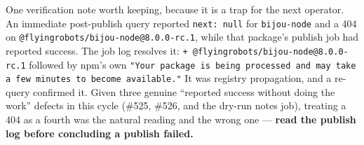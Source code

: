 One verification note worth keeping, because it is a trap for the next operator. An immediate post-publish query reported \texttt{n\allowbreak{}e\allowbreak{}x\allowbreak{}t\allowbreak{}:\allowbreak{} \allowbreak{}n\allowbreak{}u\allowbreak{}l\allowbreak{}l} for \texttt{b\allowbreak{}i\allowbreak{}j\allowbreak{}o\allowbreak{}u\allowbreak{}-\allowbreak{}n\allowbreak{}o\allowbreak{}d\allowbreak{}e} and a 404 on \texttt{@\allowbreak{}f\allowbreak{}l\allowbreak{}y\allowbreak{}i\allowbreak{}n\allowbreak{}g\allowbreak{}r\allowbreak{}o\allowbreak{}b\allowbreak{}o\allowbreak{}t\allowbreak{}s\allowbreak{}/\allowbreak{}b\allowbreak{}i\allowbreak{}j\allowbreak{}o\allowbreak{}u\allowbreak{}-\allowbreak{}n\allowbreak{}o\allowbreak{}d\allowbreak{}e\allowbreak{}@\allowbreak{}8\allowbreak{}.\allowbreak{}0\allowbreak{}.\allowbreak{}0\allowbreak{}-\allowbreak{}r\allowbreak{}c\allowbreak{}.\allowbreak{}1}, while that package's publish job had reported success. The job log resolves it: \texttt{+\allowbreak{} \allowbreak{}@\allowbreak{}f\allowbreak{}l\allowbreak{}y\allowbreak{}i\allowbreak{}n\allowbreak{}g\allowbreak{}r\allowbreak{}o\allowbreak{}b\allowbreak{}o\allowbreak{}t\allowbreak{}s\allowbreak{}/\allowbreak{}b\allowbreak{}i\allowbreak{}j\allowbreak{}o\allowbreak{}u\allowbreak{}-\allowbreak{}n\allowbreak{}o\allowbreak{}d\allowbreak{}e\allowbreak{}@\allowbreak{}8\allowbreak{}.\allowbreak{}0\allowbreak{}.\allowbreak{}0\allowbreak{}-\allowbreak{}r\allowbreak{}c\allowbreak{}.\allowbreak{}1} followed by npm's own \texttt{"\allowbreak{}Y\allowbreak{}o\allowbreak{}u\allowbreak{}r\allowbreak{} \allowbreak{}p\allowbreak{}a\allowbreak{}c\allowbreak{}k\allowbreak{}a\allowbreak{}g\allowbreak{}e\allowbreak{} \allowbreak{}i\allowbreak{}s\allowbreak{} \allowbreak{}b\allowbreak{}e\allowbreak{}i\allowbreak{}n\allowbreak{}g\allowbreak{} \allowbreak{}p\allowbreak{}r\allowbreak{}o\allowbreak{}c\allowbreak{}e\allowbreak{}s\allowbreak{}s\allowbreak{}e\allowbreak{}d\allowbreak{} \allowbreak{}a\allowbreak{}n\allowbreak{}d\allowbreak{} \allowbreak{}m\allowbreak{}a\allowbreak{}y\allowbreak{} \allowbreak{}t\allowbreak{}a\allowbreak{}k\allowbreak{}e\allowbreak{} \allowbreak{}a\allowbreak{} \allowbreak{}f\allowbreak{}e\allowbreak{}w\allowbreak{} \allowbreak{}m\allowbreak{}i\allowbreak{}n\allowbreak{}u\allowbreak{}t\allowbreak{}e\allowbreak{}s\allowbreak{} \allowbreak{}t\allowbreak{}o\allowbreak{} \allowbreak{}b\allowbreak{}e\allowbreak{}c\allowbreak{}o\allowbreak{}m\allowbreak{}e\allowbreak{} \allowbreak{}a\allowbreak{}v\allowbreak{}a\allowbreak{}i\allowbreak{}l\allowbreak{}a\allowbreak{}b\allowbreak{}l\allowbreak{}e\allowbreak{}.\allowbreak{}"} It was registry propagation, and a re-query confirmed it. Given three genuine ``reported success without doing the work'' defects in this cycle (\#525, \#526, and the dry-run notes job), treating a 404 as a fourth was the natural reading and the wrong one --- \textbf{read the publish log before concluding a publish failed.}

